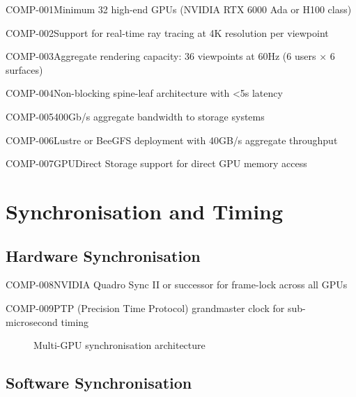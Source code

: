 \begin{requirement}{COMP-001}{Minimum 32 high-end GPUs (NVIDIA RTX 6000 Ada or H100 class)}
\begin{requirement}{COMP-002}{Support for real-time ray tracing at 4K resolution per viewpoint}
\begin{requirement}{COMP-003}{Aggregate rendering capacity: 36 viewpoints at 60Hz (6 users × 6 surfaces)}
\begin{requirement}{COMP-004}{Non-blocking spine-leaf architecture with <5\textmu s latency}
\begin{requirement}{COMP-005}{400Gb/s aggregate bandwidth to storage systems}
\begin{requirement}{COMP-006}{Lustre or BeeGFS deployment with 40GB/s aggregate throughput}
\begin{requirement}{COMP-007}{GPUDirect Storage support for direct GPU memory access}
\section{Synchronisation and Timing}

\subsection{Hardware Synchronisation}

\begin{requirement}{COMP-008}{NVIDIA Quadro Sync II or successor for frame-lock across all GPUs}

\begin{requirement}{COMP-009}{PTP (Precision Time Protocol) grandmaster clock for sub-microsecond timing}

\begin{figure}[H]
\centering
{}
\caption{Multi-GPU synchronisation architecture}
\end{figure}

\subsection{Software Synchronisation}


\end{requirement}
\end{requirement}
\end{requirement}
\end{requirement}
\end{requirement}
\end{requirement}
\end{requirement}
\end{requirement}
\end{requirement}
